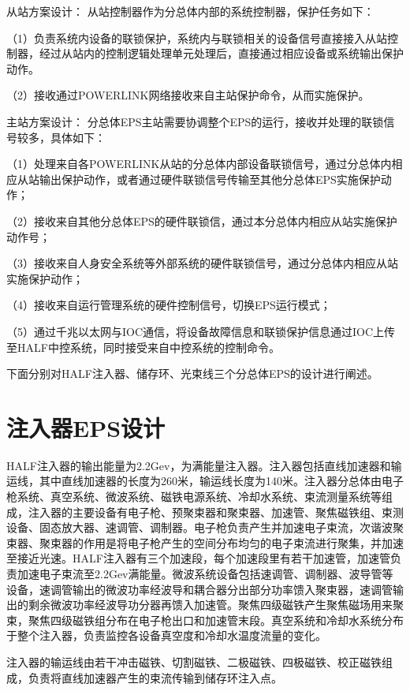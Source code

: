 从站方案设计：
从站控制器作为分总体内部的系统控制器，保护任务如下：

（1）负责系统内设备的联锁保护，系统内与联锁相关的设备信号直接接入从站控制器，经过从站内的控制逻辑处理单元处理后，直接通过相应设备或系统输出保护动作。

（2）接收通过POWERLINK网络接收来自主站保护命令，从而实施保护。

主站方案设计：
分总体EPS主站需要协调整个EPS的运行，接收并处理的联锁信号较多，具体如下：

（1）处理来自各POWERLINK从站的分总体内部设备联锁信号，通过分总体内相应从站输出保护动作，或者通过硬件联锁信号传输至其他分总体EPS实施保护动作；

（2）接收来自其他分总体EPS的硬件联锁信，通过本分总体内相应从站实施保护动作号；
  		
（3）接收来自人身安全系统等外部系统的硬件联锁信号，通过分总体内相应从站实施保护动作；

（4）接收来自运行管理系统的硬件控制信号，切换EPS运行模式；

（5）通过千兆以太网与IOC通信，将设备故障信息和联锁保护信息通过IOC上传至HALF中控系统，同时接受来自中控系统的控制命令。

下面分别对HALF注入器、储存环、光束线三个分总体EPS的设计进行阐述。

\section{注入器EPS设计}

HALF注入器的输出能量为2.2Gev，为满能量注入器。注入器包括直线加速器和输运线，其中直线加速器的长度为260米，输运线长度为140米。注入器分总体由电子枪系统、真空系统、微波系统、磁铁电源系统、冷却水系统、束流测量系统等组成，注入器的主要设备有电子枪、预聚束器和聚束器、加速管、聚焦磁铁组、束测设备、固态放大器、速调管、调制器。电子枪负责产生并加速电子束流，次谐波聚束器、聚束器的作用是将电子枪产生的空间分布均匀的电子束流进行聚集，并加速至接近光速。HALF注入器有三个加速段，每个加速段里有若干加速管，加速管负责加速电子束流至2.2Gev满能量。微波系统设备包括速调管、调制器、波导管等设备，速调管输出的微波功率经波导和耦合器分出部分功率馈入聚束器，速调管输出的剩余微波功率经波导功分器再馈入加速管。聚焦四级磁铁产生聚焦磁场用来聚束，聚焦四级磁铁组分布在电子枪出口和加速管末段。真空系统和冷却水系统分布于整个注入器，负责监控各设备真空度和冷却水温度流量的变化。

注入器的输运线由若干冲击磁铁、切割磁铁、二极磁铁、四极磁铁、校正磁铁组成，负责将直线加速器产生的束流传输到储存环注入点。

